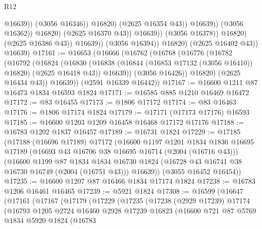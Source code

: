 \begin{lexlean}{R12}
\begin{coremodule}
                                              @16639))
                                          (@3056 @16346))
                                        @16820)
                                      (@2625 @16354 @43))
                                    @16639))
                                (@3056 @16362))
                              @16820)
                            (@2625 @16370 @43))
                          @16639))
                      (@3056 @16378))
                    @16820)
                  (@2625 @16386 @43))
                @16639))
            (@3056 @16394))
          @16820)
        (@2625 @16402 @43))
      @16639)
@17161 := @16653
    (@16666
      (@16762
        (@16768
          (@16776
            (@16782
              (@16792
                (@16824
                  (@16830
                    (@16838 (@16844 (@16853 @17132 (@3056 @16410)) @16820) (@2625 @16418 @43))
                    @16639))
                (@3056 @16426))
              @16820)
            (@2625 @16434 @43))
          @16639))
      (@2591 @16339 @16442))
@17167 := @16600 @1211 @87 @16473 @1834 @16593 @1824
@17171 := @16585 @885 @1210 @16469 @16472
@17172 := @83 @16455
@17173 := @1806 @17172
@17174 := @83 @16463
@17176 := @1806 @17174 @1824
@17179 := @17171 (@17173 @17176) @16593
@17185 := @16600 @1203 @1209 @16458 @16468 @17172 @17176
@17188 := @16783 @1202 @1837 @16457
@17189 := @16731 @1824
@17229 := @17185
    (@17188
      (@16696 @17189)
      @17172
      (@16600
        @1197
        @1201
        @1834
        @1836
        @16695
        @17189
        (@16693 @43 @16706 @38 @16695 @16714 (@2004 (@16716 @43)))
        (@16600
          @1199
          @87
          @1834
          @1834
          @16730
          @1824
          (@16728 @43 @16741 @38 @16730 @16749 (@2004 (@16751 @43)))
          @16639))
      (@3055 @16452 @16454))
@17235 := @16600 @1207 @87 @16466 @1834 @17174 @1824
@17238 := @16783 @1206 @16461 @16465
@17239 := @5921 @1824
@17308 := @16599
    (@16647
      (@17161
        (@17167
          (@17179
            (@17229
              (@17235
                (@17238
                  (@2929 @17239)
                  @17174
                  (@16793
                    @1205
                    @2724
                    @16460
                    @2928
                    @17239
                    @16823
                    (@16600
                      @721
                      @87
                      @5769
                      @1834
                      @5920
                      @1824
                      (@16783

\end{coremodule}
\end{lexlean}
